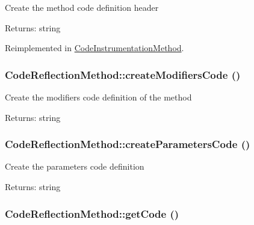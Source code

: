 Create the method code definition header

\begin{Desc}
\item[Returns:]string \end{Desc}


Reimplemented in \hyperlink{class_code_instrumentation_method_0eab7bf9706fa3867605f3db1822c333}{CodeInstrumentationMethod}.\hypertarget{class_code_reflection_method_f2457c6e356d735b29253563175d0523}{
\subsubsection[{createModifiersCode}]{\setlength{\rightskip}{0pt plus 5cm}CodeReflectionMethod::createModifiersCode ()}}
\label{class_code_reflection_method_f2457c6e356d735b29253563175d0523}


Create the modifiers code definition of the method

\begin{Desc}
\item[Returns:]string \end{Desc}
\hypertarget{class_code_reflection_method_803892b766bfd1aba81f5e63ed248676}{
\subsubsection[{createParametersCode}]{\setlength{\rightskip}{0pt plus 5cm}CodeReflectionMethod::createParametersCode ()}}
\label{class_code_reflection_method_803892b766bfd1aba81f5e63ed248676}


Create the parameters code definition

\begin{Desc}
\item[Returns:]string \end{Desc}
\hypertarget{class_code_reflection_method_9ea590fa1500f62805d106332634893e}{
\subsubsection[{getCode}]{\setlength{\rightskip}{0pt plus 5cm}CodeReflectionMethod::getCode ()}}
\label{class_code_reflection_method_9ea590fa1500f62805d106332634893e}


